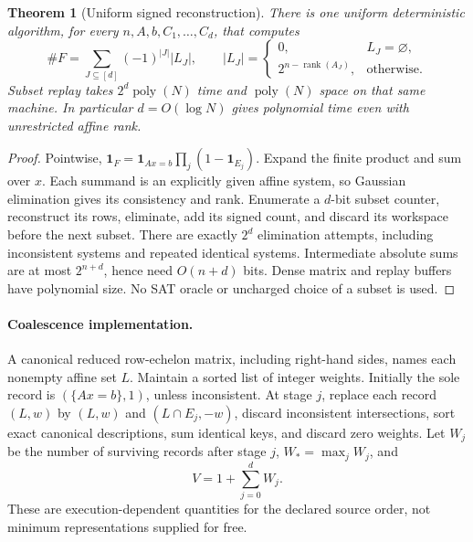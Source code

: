 \documentclass[11pt]{article}
\newtheorem{theorem}{Theorem}
\begin{document}
\begin{theorem}[Uniform signed reconstruction]\label{thm:count}
There is one uniform deterministic algorithm, for every $n,A,b,C_1,\ldots,C_d$,
that computes
\[
 \#F=\sum_{J\subseteq[d]}(-1)^{|J|}|L_J|,\qquad
 |L_J|=\begin{cases}0,&L_J=\varnothing,\\
 2^{n-\operatorname{rank}(A_J)},&\text{otherwise}.
 \end{cases}                                                   \tag{1}
\]
Subset replay takes $2^d\operatorname{poly}(N)$ time and
$\operatorname{poly}(N)$ space on that same machine.
In particular $d=O(\log N)$ gives polynomial time even with unrestricted
affine rank.
\end{theorem}
\begin{proof}
Pointwise,
$\mathbf1_F=\mathbf1_{Ax=b}\prod_j(1-\mathbf1_{E_j})$.
Expand the finite product and sum over $x$. Each summand is an explicitly
given affine system, so Gaussian elimination gives its consistency and rank.
Enumerate a $d$-bit subset counter, reconstruct its rows, eliminate, add its
signed count, and discard its workspace before the next subset. There are
exactly $2^d$ elimination attempts, including inconsistent systems and repeated
identical systems. Intermediate absolute sums are at most $2^{n+d}$, hence
need $O(n+d)$ bits. Dense matrix and replay buffers have polynomial size.
No SAT oracle or uncharged choice of a subset is used.
\end{proof}

\paragraph{Coalescence implementation.}
A canonical reduced row-echelon matrix, including right-hand sides, names
each nonempty affine set $L$. Maintain a sorted list of integer weights.
Initially the sole record is $(\{Ax=b\},1)$, unless inconsistent. At stage $j$,
replace each record $(L,w)$ by $(L,w)$ and $(L\cap E_j,-w)$, discard inconsistent
intersections, sort exact canonical descriptions, sum identical keys, and
discard zero weights. Let $W_j$ be the number of surviving records after stage
$j$, $W_*=\max_jW_j$, and
\[
 V=1+\sum_{j=0}^{d}W_j.                                        \tag{2}
\]
These are execution-dependent quantities for the declared source order,
not minimum representations supplied for free.
\end{document}
